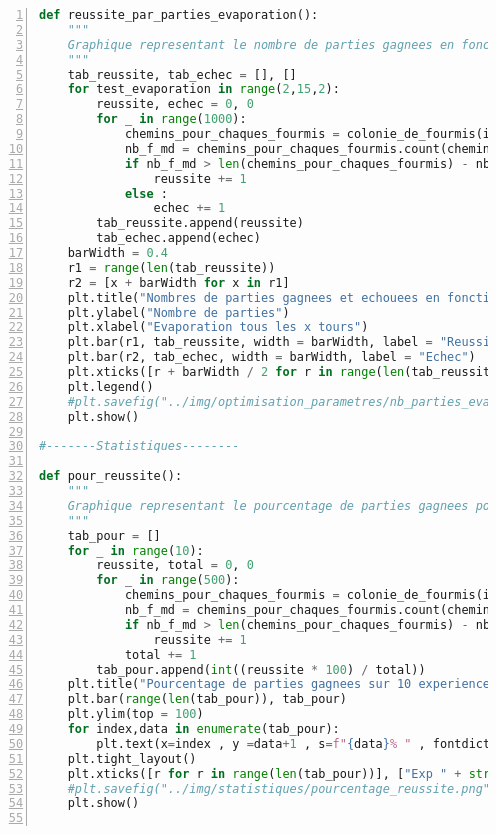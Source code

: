 \documentclass[
12pt,
french,
]{article}
\begin{document}
\begin{lstlisting}[language=Python, numbers=left, label=colonies_fourmis]
def reussite_par_parties_evaporation():
    """
    Graphique representant le nombre de parties gagnees en fonction de la frequence d'evaporation
    """
    tab_reussite, tab_echec = [], []
    for test_evaporation in range(2,15,2):
        reussite, echec = 0, 0
        for _ in range(1000):
            chemins_pour_chaques_fourmis = colonie_de_fourmis(initialise_model(l_aretes),test_evaporation,nb_fourmis_demo)
            nb_f_md = chemins_pour_chaques_fourmis.count(chemin_gagnant)
            if nb_f_md > len(chemins_pour_chaques_fourmis) - nb_f_md :
                reussite += 1
            else :
                echec += 1
        tab_reussite.append(reussite)
        tab_echec.append(echec)
    barWidth = 0.4
    r1 = range(len(tab_reussite))
    r2 = [x + barWidth for x in r1]
    plt.title("Nombres de parties gagnees et echouees en fonction de l'evaporation")
    plt.ylabel("Nombre de parties")
    plt.xlabel("Evaporation tous les x tours")
    plt.bar(r1, tab_reussite, width = barWidth, label = "Reussite")
    plt.bar(r2, tab_echec, width = barWidth, label = "Echec")
    plt.xticks([r + barWidth / 2 for r in range(len(tab_reussite))], [eva for eva in range(2,15,2)])
    plt.legend()
    #plt.savefig("../img/optimisation_parametres/nb_parties_evaporation.png")
    plt.show()

#-------Statistiques--------

def pour_reussite():
    """
    Graphique representant le pourcentage de parties gagnees pour 10 experiences
    """
    tab_pour = []
    for _ in range(10):
        reussite, total = 0, 0
        for _ in range(500):
            chemins_pour_chaques_fourmis = colonie_de_fourmis(initialise_model(l_aretes),t_evaporation,nb_fourmis_demo)
            nb_f_md = chemins_pour_chaques_fourmis.count(chemin_gagnant)
            if nb_f_md > len(chemins_pour_chaques_fourmis) - nb_f_md :
                reussite += 1
            total += 1
        tab_pour.append(int((reussite * 100) / total))
    plt.title("Pourcentage de parties gagnees sur 10 experiences")
    plt.bar(range(len(tab_pour)), tab_pour)
    plt.ylim(top = 100)
    for index,data in enumerate(tab_pour):
        plt.text(x=index , y =data+1 , s=f"{data}% " , fontdict=dict(fontsize=10))
    plt.tight_layout()
    plt.xticks([r for r in range(len(tab_pour))], ["Exp " + str(par) for par in range(0,10)])
    #plt.savefig("../img/statistiques/pourcentage_reussite.png")
    plt.show()


\end{lstlisting}
\end{document}
